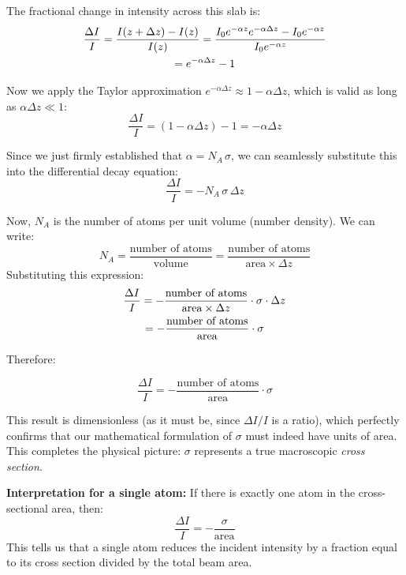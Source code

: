 The fractional change in intensity across this slab is:
\begin{gather*}
    \frac{\Delta I}{I} = \frac{I(z+\Delta z) - I(z)}{I(z)} = \frac{I_0 e^{-\alpha z} e^{-\alpha\Delta z} - I_0 e^{-\alpha z}}{I_0 e^{-\alpha z}} \notag \\
    = e^{-\alpha\Delta z} - 1
\end{gather*}

Now we apply the Taylor approximation $e^{-\alpha\Delta z} \approx 1 - \alpha\Delta z$, which is valid as long as $\alpha\Delta z \ll 1$:
\begin{equation*}
    \frac{\Delta I}{I} = (1 - \alpha\Delta z) - 1 = -\alpha\Delta z
\end{equation*}

Since we just firmly established that $\alpha = N_A\,\sigma$, we can seamlessly substitute this into the differential decay equation:
\begin{equation*}
    \frac{\Delta I}{I} = -N_A\,\sigma\,\Delta z
\end{equation*}

Now, $N_A$ is the number of atoms per unit volume (number density). We can write:
\begin{equation*}
    N_A = \frac{\text{number of atoms}}{\text{volume}} = \frac{\text{number of atoms}}{\text{area} \times \Delta z}
\end{equation*}
Substituting this expression:
\begin{gather*}
    \frac{\Delta I}{I} = -\frac{\text{number of atoms}}{\text{area} \times \Delta z} \cdot \sigma \cdot \Delta z \notag \\
    = -\frac{\text{number of atoms}}{\text{area}} \cdot \sigma
\end{gather*}

Therefore:
\begin{keyresult}
    \begin{equation}
        \frac{\Delta I}{I} = -\frac{\text{number of atoms}}{\text{area}} \cdot \sigma
    \end{equation}
\end{keyresult}

This result is dimensionless (as it must be, since $\Delta I/I$ is a ratio), which perfectly confirms that our mathematical formulation of $\sigma$ must indeed have units of area. This completes the physical picture: $\sigma$ represents a true macroscopic \emph{cross section}.

\textbf{Interpretation for a single atom:} If there is exactly one atom in the cross-sectional area, then:
\begin{equation*}
    \frac{\Delta I}{I} = -\frac{\sigma}{\text{area}}
\end{equation*}
This tells us that a single atom reduces the incident intensity by a fraction equal to its cross section divided by the total beam area.

